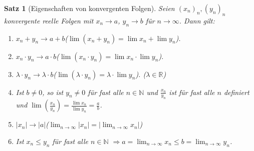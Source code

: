\documentclass[11pt, twoside, a4paper]{article}
\theoremstyle{plain}
\newtheorem{satz}[blockelement]{Satz}
\newcommand{\pair}[1]{\left(#1\right)}
\newcommand{\abs}[1]{\left|#1\right|}
\newcommand{\impl}[0]{\Rightarrow{}}
\newcommand{\fromto}{\rightarrow{}}
\newcommand{\naturalnumbers}{\mathbb{N}}
\newcommand{\realnumbers}{\mathbb{R}}
\begin{document}
    \begin{satz}[Eigenschaften von konvergenten Folgen]
        \label{satz:konvergenzsaetze}
        Seien $(x_n)_n, (y_n)_n$ konvergente reelle Folgen mit $x_n\fromto a$, $y_n\fromto b$ für $n\fromto\infty$. Dann gilt:
        \begin{enumerate}[label=(\alph*)]
            \item $x_n+y_n\fromto a+b$\quad ($\lim\pair{x_n+y_n}=\lim x_n + \lim y_n$).
            \item $x_n\cdot y_n \fromto a\cdot b$\quad ($\lim\pair{x_n\cdot y_n} = \lim x_n \cdot \lim y_n$).
            \item $\lambda\cdot y_n \fromto \lambda\cdot b$\quad ($\lim\pair{\lambda\cdot y_n} = \lambda \cdot \lim y_n$). ($\lambda\in\realnumbers$)
            \item Ist $b\neq 0$, so ist $y_n \neq 0$ für fast alle $n\in\naturalnumbers$ und $\frac{x_n}{y_n}$ ist für fast alle $n$ definiert und $\lim\pair{\frac{x_n}{y_n}} = \frac{\lim x_n}{\lim y_n} = \frac{a}{b}$.
            \item $\abs{x_n} \fromto \abs{a}$\quad ($\lim_{n\fromto \infty} \abs{x_n} = \abs{\lim_{n\fromto \infty} x_n}$)
            \item Ist $x_n \leq y_n$ für fast alle $n\in\naturalnumbers$ $\impl a = \lim_{n\fromto \infty} x_n \leq b = \lim_{n\fromto \infty} y_n$.
        \end{enumerate}


\end{satz}
\end{document}
